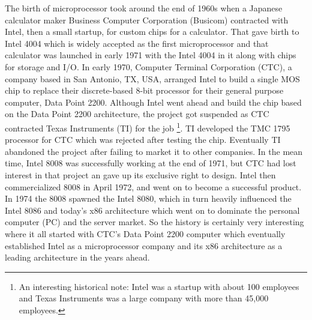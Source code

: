 \documentclass[journal]{IEEEtran}
\begin{document}
The birth of microprocessor took around the end of 1960s when a Japanese calculator maker Business Computer Corporation (Busicom) contracted with Intel, then a small startup, for custom chips for a calculator. That gave birth to Intel 4004 which is widely accepted as the first microprocessor and that calculator was launched in early 1971 with the Intel 4004 in it along with chips for storage and I/O. In early 1970, Computer Terminal Corporation (CTC), a company based in San Antonio, TX, USA, arranged Intel to build a single MOS chip to replace their discrete-based 8-bit processor for their general purpose computer, Data Point 2200. Although Intel went ahead and build the chip based on the Data Point 2200 architecture, the project got suspended as CTC contracted Texas Instruments (TI) for the job \footnote{An interesting historical note: Intel was a startup with about 100 employees and Texas Instruments was a large company with more than 45,000 employees.}. TI developed the TMC 1795 processor for CTC which was rejected after testing the chip. Eventually TI abandoned the project after failing to market it to other companies. In the mean time, Intel 8008 was successfully working at the end of 1971, but CTC had lost interest in that project an gave up its exclusive right to design. Intel then commercialized 8008 in April 1972, and went on to become a successful product. In 1974 the 8008 spawned the Intel 8080, which in turn heavily influenced the Intel 8086 and today's x86 architecture which went on to dominate the personal computer (PC) and the server market. So the history is certainly very interesting where it all started with CTC's Data Point 2200 computer which eventually established Intel as a microprocessor company and its x86 architecture as a leading architecture in the years ahead.


\ifCLASSOPTIONcaptionsoff
  \newpage
\fi



\end{document}
